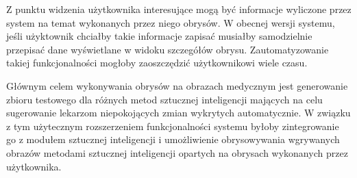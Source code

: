 \documentclass[a4paper,11pt,twoside,openright]{report}
\theoremstyle{definition}
\begin{document}
Z punktu widzenia użytkownika interesujące mogą być informacje wyliczone przez system na temat wykonanych przez niego obrysów. W obecnej wersji systemu, jeśli użyktownik chciałby takie informacje zapisać musiałby samodzielnie przepisać dane wyświetlane w widoku szczegółów obrysu. Zautomatyzowanie takiej funkcjonalności mogłoby zaoszczędzić użytkownikowi wiele czasu.

Głównym celem wykonywania obrysów na obrazach medycznym jest generowanie zbioru testowego dla różnych metod sztucznej inteligencji mających na celu sugerowanie lekarzom niepokojących zmian wykrytych automatycznie. W związku z tym użytecznym rozszerzeniem funkcjonalności systemu byłoby zintegrowanie go z modułem sztucznej inteligencji i umożliwienie obrysowywania wgrywanych obrazów metodami sztucznej inteligencji opartych na obrysach wykonanych przez użytkownika.





\end{document}
